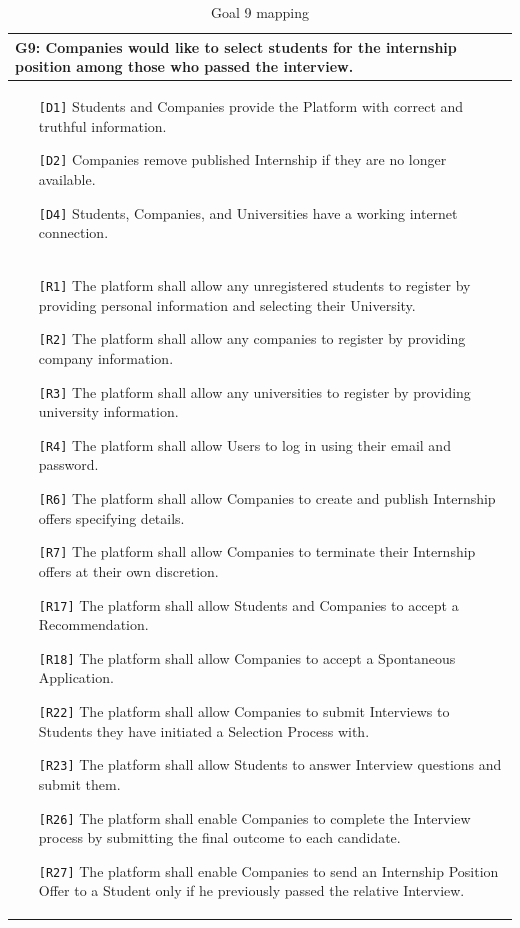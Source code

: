 \begin{table}[H]
    \centering
    \begin{tabular}{|p{15cm}|}
        \hline
        \textbf{G9:} Companies would like to select students for the internship position among those who passed the interview. \\ \hline
        \begin{itemize}
            \item[\texttt{[D1]}] Students and Companies provide the Platform with correct and truthful information.
            \item[\texttt{[D2]}] Companies remove published Internship if they are no longer available. 
            \item[\texttt{[D4]}] Students, Companies, and Universities have a working internet connection.
        \end{itemize} \\ \hline
        \begin{itemize}
            \item[\texttt{[R1]}] The platform shall allow any unregistered students to register by providing personal information and selecting their University.
            \item[\texttt{[R2]}] The platform shall allow any companies to register by providing company information.
            \item[\texttt{[R3]}] The platform shall allow any universities to register by providing university information.
            \item[\texttt{[R4]}] The platform shall allow Users to log in using their email and password.
            \item[\texttt{[R6]}] The platform shall allow Companies to create and publish Internship offers specifying details.
            \item[\texttt{[R7]}] The platform shall allow Companies to terminate their Internship offers at their own discretion.
            \item[\texttt{[R17]}] The platform shall allow Students and Companies to accept a Recommendation.
            \item[\texttt{[R18]}] The platform shall allow Companies to accept a Spontaneous Application.
            \item[\texttt{[R22]}] The platform shall allow Companies to submit Interviews to Students they have initiated a Selection Process with.
            \item[\texttt{[R23]}] The platform shall allow Students to answer Interview questions and submit them.
            \item[\texttt{[R26]}] The platform shall enable Companies to complete the Interview process by submitting the final outcome to each candidate.
            \item[\texttt{[R27]}] The platform shall enable Companies to send an Internship Position Offer to a Student only if he previously passed the relative Interview.
        \end{itemize} \\ \hline
    \end{tabular}
    \caption{Goal 9 mapping}
    \label{tab:G9}
\end{table}


